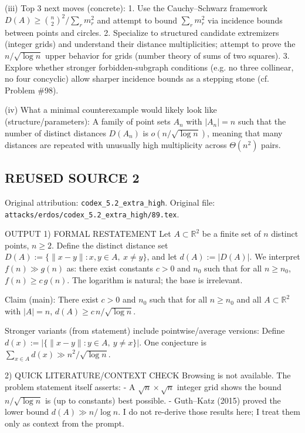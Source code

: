 (iii) Top 3 next moves (concrete):
1. Use the Cauchy--Schwarz framework $D(A)\ge \binom{n}{2}^2 / \sum_r m_r^2$ and attempt to bound $\sum_r m_r^2$ via incidence bounds between points and circles.
2. Specialize to structured candidate extremizers (integer grids) and understand their distance multiplicities; attempt to prove the $n/\sqrt{\log n}$ upper behavior for grids (number theory of sums of two squares).
3. Explore whether stronger forbidden-subgraph conditions (e.g. no three collinear, no four concyclic) allow sharper incidence bounds as a stepping stone (cf. Problem \#98).

(iv) What a minimal counterexample would likely look like (structure/parameters):
A family of point sets $A_n$ with $|A_n|=n$ such that the number of distinct distances $D(A_n)$ is $o\!\left(n/\sqrt{\log n}\right)$,
meaning that many distances are repeated with unusually high multiplicity across $\Theta(n^2)$ pairs.



\subsection*{REUSED SOURCE 2}
Original attribution: \texttt{codex\_5.2\_extra\_high}.
Original file: \texttt{attacks/erdos/codex\_5.2\_extra\_high/89.tex}.


OUTPUT
1) FORMAL RESTATEMENT
Let $A \subset \mathbb{R}^2$ be a finite set of $n$ distinct points, $n \ge 2$.
Define the distinct distance set
  $D(A) := \{ \|x-y\| : x,y \in A,\ x\neq y\}$,
and let $d(A) := |D(A)|$.
We interpret $f(n) \gg g(n)$ as: there exist constants $c>0$ and $n_0$ such that
for all $n \ge n_0$, $f(n) \ge c\, g(n)$. The logarithm is natural; the base is irrelevant.

Claim (main): There exist $c>0$ and $n_0$ such that for all $n \ge n_0$ and all
$A \subset \mathbb{R}^2$ with $|A|=n$,
  $d(A) \ge c\, n/\sqrt{\log n}$.

Stronger variants (from statement) include pointwise/average versions:
Define $d(x) := |\{\|x-y\|: y\in A,\ y\neq x\}|$. One conjecture is
  $\sum_{x\in A} d(x) \gg n^2/\sqrt{\log n}$.

2) QUICK LITERATURE/CONTEXT CHECK
Browsing is not available. The problem statement itself asserts:
- A $\sqrt{n}\times\sqrt{n}$ integer grid shows the bound $n/\sqrt{\log n}$ is
  (up to constants) best possible.
- Guth--Katz (2015) proved the lower bound $d(A) \gg n/\log n$.
I do not re-derive those results here; I treat them only as context from the prompt.

